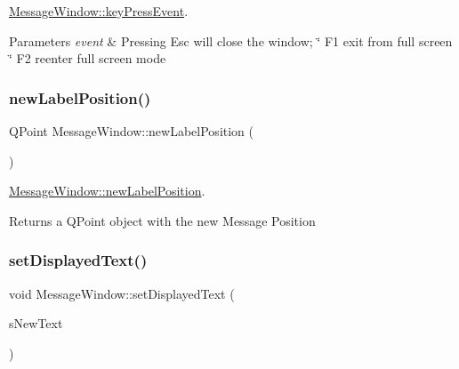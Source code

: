 \mbox{\hyperlink{classMessageWindow_adc919ddd8974835eb9f44d9cd5362f18}{Message\+Window\+::key\+Press\+Event}}. 


\begin{DoxyParams}{Parameters}
{\em event} & Pressing Esc will close the window; \char`\"{}    F1  exit from full screen
    \char`\"{} F2 reenter full screen mode \\
\hline
\end{DoxyParams}
\mbox{\label{classMessageWindow_ae2a86d5e5a9a35692303e5c057079dc5}} 
\subsubsection{\texorpdfstring{new\+Label\+Position()}{newLabelPosition()}}
{\footnotesize\ttfamily Q\+Point Message\+Window\+::new\+Label\+Position (\begin{DoxyParamCaption}{ }\end{DoxyParamCaption})\hspace{0.3cm}{\ttfamily [protected]}}



\mbox{\hyperlink{classMessageWindow_ae2a86d5e5a9a35692303e5c057079dc5}{Message\+Window\+::new\+Label\+Position}}. 

\begin{DoxyReturn}{Returns}
a Q\+Point object with the new Message Position 
\end{DoxyReturn}
\mbox{\label{classMessageWindow_ad3b6dcb371660e6a3e0ded36564afafa}} 
\subsubsection{\texorpdfstring{set\+Displayed\+Text()}{setDisplayedText()}}
{\footnotesize\ttfamily void Message\+Window\+::set\+Displayed\+Text (\begin{DoxyParamCaption}\item[{Q\+String}]{s\+New\+Text }\end{DoxyParamCaption})}



